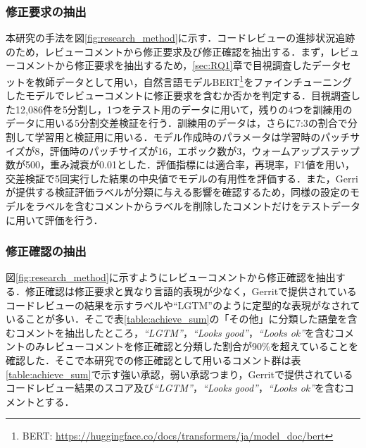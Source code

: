 \documentclass[submit,techrep,noauthor]{ipsj}
\begin{document}
\subsubsection{修正要求の抽出}
本研究の手法を図\ref{fig:research_method}に示す．コードレビューの進捗状況追跡のため，レビューコメントから修正要求及び修正確認を抽出する．まず，レビューコメントから修正要求を抽出するため，\ref{sec:RQ1}章で目視調査したデータセットを教師データとして用い，自然言語モデルBERT\footnote{BERT: \url{https://huggingface.co/docs/transformers/ja/model_doc/bert}}をファインチューニングしたモデルでレビューコメントに修正要求を含むか否かを判定する．目視調査した12,086件を5分割し，1つをテスト用のデータに用いて，残りの4つを訓練用のデータに用いる5分割交差検証を行う．訓練用のデータは，さらに7:3の割合で分割して学習用と検証用に用いる．モデル作成時のパラメータは学習時のパッチサイズが8，評価時のパッチサイズが16，エポック数が3，ウォームアップステップ数が500，重み減衰が0.01とした．評価指標には適合率，再現率，F1値を用い，交差検証で5回実行した結果の中央値でモデルの有用性を評価する．また，Gerriが提供する検証評価ラベルが分類に与える影響を確認するため，同様の設定のモデルをラベルを含むコメントからラベルを削除したコメントだけをテストデータに用いて評価を行う．

\subsubsection{修正確認の抽出}
図\ref{fig:research_method}に示すようにレビューコメントから修正確認を抽出する．修正確認は修正要求と異なり言語的表現が少なく，Gerritで提供されているコードレビューの結果を示すラベルや``LGTM''のように定型的な表現がなされていることが多い．そこで表\ref{table:achieve_sum}の「その他」に分類した語彙を含むコメントを抽出したところ，\textit{``LGTM''}，\textit{``Looks good''}，\textit{``Looks ok''}を含むコメントのみレビューコメントを修正確認と分類した割合が90\%を超えていることを確認した．そこで本研究での修正確認として用いるコメント群は表\ref{table:achieve_sum}で示す強い承認，弱い承認つまり，Gerritで提供されているコードレビュー結果のスコア及び\textit{``LGTM''}，\textit{``Looks good''}，\textit{``Looks ok''}を含むコメントとする．
\end{document}
